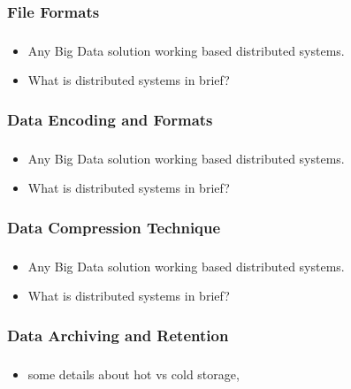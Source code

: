 \subsubsection{File Formats}

\begin{frame}
\frametitle{\subsecname}
\begin{itemize}[<+->]
	\item Any Big Data solution working based distributed systems.
	\item What is distributed systems in brief?
\end{itemize}
\end{frame}
\subsubsection{Data Encoding and Formats}

\begin{frame}
\frametitle{\subsecname}
\begin{itemize}[<+->]
	\item Any Big Data solution working based distributed systems.
	\item What is distributed systems in brief?
\end{itemize}
\end{frame}
\subsubsection{Data Compression Technique}

\begin{frame}
\frametitle{\subsecname}
\begin{itemize}[<+->]
\item Any Big Data solution working based distributed systems.
\item What is distributed systems in brief?
\end{itemize}
\end{frame}

\subsubsection{Data Archiving and Retention}
\begin{frame}
\frametitle{\subsecname}
\begin{itemize}[<+->]
	\item some details about hot vs cold storage,
\end{itemize}
\end{frame}

